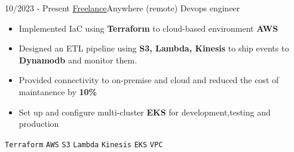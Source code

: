 \documentclass[9pt]{developercv} %
\begin{document}
\vspace{-5pt}
\begin{entrylist}
    \entry
    {10/2023 - Present}
    {\href{https://github.com/mjekrami}{Freelance}\newline\small\textnormal{Anywhere (remote)}}
    {Devops engineer}
    {\vspace{-6pt}
    \begin{itemize}[itemsep=2pt,topsep=0pt,parsep=0pt,partopsep=0pt, leftmargin=-1pt]
        \item{Implemented IaC using \textbf{Terraform} to cloud-based environment \textbf{AWS}}
        \item{Designed an ETL pipeline using \textbf{S3, Lambda, Kinesis} to ship events to \textbf{Dynamodb} and monitor them.}
        \item{Provided connectivity to on-premise and cloud and reduced the cost of maintanence by \textbf{10\%}}
        \item{Set up and configure multi-cluster \textbf{EKS} for development,testing and production}
    \end{itemize}
    {\vspace{2pt}}
    \texttt{Terraform} \slashsep \texttt{AWS} \slashsep \texttt{S3} \slashsep \texttt{Lambda} \slashsep \texttt{Kinesis} \slashsep \texttt{EKS} \slashsep \texttt{VPC}}
\end{entrylist}
\end{document}
